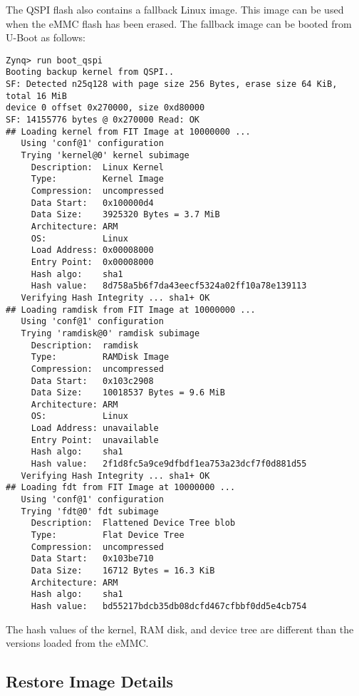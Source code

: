 \newpage
The QSPI flash also contains a fallback Linux image. This image can be used when the eMMC flash has
been erased. The fallback image can be booted from U-Boot as follows:
%
\begin{verbatim}
Zynq> run boot_qspi
Booting backup kernel from QSPI..
SF: Detected n25q128 with page size 256 Bytes, erase size 64 KiB, total 16 MiB
device 0 offset 0x270000, size 0xd80000
SF: 14155776 bytes @ 0x270000 Read: OK
## Loading kernel from FIT Image at 10000000 ...
   Using 'conf@1' configuration
   Trying 'kernel@0' kernel subimage
     Description:  Linux Kernel
     Type:         Kernel Image
     Compression:  uncompressed
     Data Start:   0x100000d4
     Data Size:    3925320 Bytes = 3.7 MiB
     Architecture: ARM
     OS:           Linux
     Load Address: 0x00008000
     Entry Point:  0x00008000
     Hash algo:    sha1
     Hash value:   8d758a5b6f7da43eecf5324a02ff10a78e139113
   Verifying Hash Integrity ... sha1+ OK
## Loading ramdisk from FIT Image at 10000000 ...
   Using 'conf@1' configuration
   Trying 'ramdisk@0' ramdisk subimage
     Description:  ramdisk
     Type:         RAMDisk Image
     Compression:  uncompressed
     Data Start:   0x103c2908
     Data Size:    10018537 Bytes = 9.6 MiB
     Architecture: ARM
     OS:           Linux
     Load Address: unavailable
     Entry Point:  unavailable
     Hash algo:    sha1
     Hash value:   2f1d8fc5a9ce9dfbdf1ea753a23dcf7f0d881d55
   Verifying Hash Integrity ... sha1+ OK
## Loading fdt from FIT Image at 10000000 ...
   Using 'conf@1' configuration
   Trying 'fdt@0' fdt subimage
     Description:  Flattened Device Tree blob
     Type:         Flat Device Tree
     Compression:  uncompressed
     Data Start:   0x103be710
     Data Size:    16712 Bytes = 16.3 KiB
     Architecture: ARM
     Hash algo:    sha1
     Hash value:   bd55217bdcb35db08dcfd467cfbbf0dd5e4cb754
\end{verbatim}
%
The hash values of the kernel, RAM disk, and device tree are different than
the versions loaded from the eMMC.

\newpage
\subsection{Restore Image Details}
\label{sec:restore_image_details}

